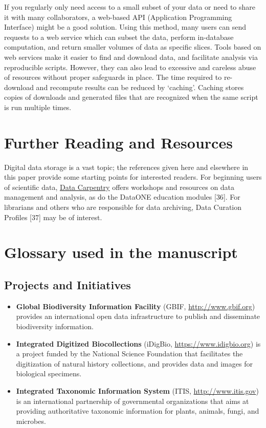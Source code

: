 \documentclass[10pt,letterpaper]{article}
\begin{document}
If you regularly only need access to a small subset of your data or need
to share it with many collaborators, a web-based API (Application
Programming Interface) might be a good solution. Using this method, many
users can send requests to a web service which can subset the data,
perform in-database computation, and return smaller volumes of data as
specific slices. Tools based on web services make it easier to find and
download data, and facilitate analysis via reproducible scripts.
However, they can also lead to excessive and careless abuse of resources
without proper safeguards in place. The time required to re-download and
recompute results can be reduced by `caching'. Caching stores copies of
downloads and generated files that are recognized when the same script
is run multiple times.

\section*{Further Reading and
Resources}\label{further-reading-and-resources}

Digital data storage is a vast topic; the references given here and
elsewhere in this paper provide some starting points for interested
readers. For beginning users of scientific data,
\href{http://datacarpentry.org}{Data Carpentry} offers workshops and
resources on data management and analysis, as do the DataONE education
modules {[}36{]}. For librarians and others who are responsible for data
archiving, Data Curation Profiles {[}37{]} may be of interest.

\section*{Glossary used in the
manuscript}\label{glossary-used-in-the-manuscript}

\subsection*{Projects and Initiatives}\label{projects-and-initiatives}

\begin{itemize}
\item
  \textbf{Global Biodiversity Information Facility} (GBIF,
  \url{http://www.gbif.org}) provides an international open data
  infrastructure to publish and disseminate biodiversity information.
\item
  \textbf{Integrated Digitized Biocollections} (iDigBio,
  \url{https://www.idigbio.org}) is a project funded by the National
  Science Foundation that facilitates the digitization of natural
  history collections, and provides data and images for biological
  specimens.
\item
  \textbf{Integrated Taxonomic Information System} (ITIS,
  \url{http://www.itis.gov}) is an international partnership of
  governmental organizations that aims at providing authoritative
  taxonomic information for plants, animals, fungi, and microbes.
\end{itemize}
\end{document}
